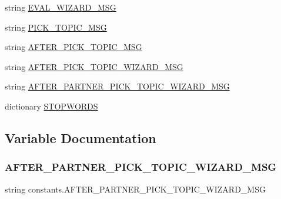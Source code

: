 \begin{DoxyCompactItemize}
\item 
string \hyperlink{namespaceconstants_a4352b762075995e38d4c552cc55c0c1b}{E\+V\+A\+L\+\_\+\+W\+I\+Z\+A\+R\+D\+\_\+\+M\+SG}
\item 
string \hyperlink{namespaceconstants_acae330a714f2af2847a73260cf9432b5}{P\+I\+C\+K\+\_\+\+T\+O\+P\+I\+C\+\_\+\+M\+SG}
\item 
string \hyperlink{namespaceconstants_a03deb02bcbfce040cb3032693984d549}{A\+F\+T\+E\+R\+\_\+\+P\+I\+C\+K\+\_\+\+T\+O\+P\+I\+C\+\_\+\+M\+SG}
\item 
string \hyperlink{namespaceconstants_a9467c4e56b02e5074de9e47080de58d2}{A\+F\+T\+E\+R\+\_\+\+P\+I\+C\+K\+\_\+\+T\+O\+P\+I\+C\+\_\+\+W\+I\+Z\+A\+R\+D\+\_\+\+M\+SG}
\item 
string \hyperlink{namespaceconstants_ae875e4f1f451355191b81441a2962af6}{A\+F\+T\+E\+R\+\_\+\+P\+A\+R\+T\+N\+E\+R\+\_\+\+P\+I\+C\+K\+\_\+\+T\+O\+P\+I\+C\+\_\+\+W\+I\+Z\+A\+R\+D\+\_\+\+M\+SG}
\item 
dictionary \hyperlink{namespaceconstants_a152298a9d1d6403ab158220917245953}{S\+T\+O\+P\+W\+O\+R\+DS}
\end{DoxyCompactItemize}


\subsection{Variable Documentation}
\mbox{\label{namespaceconstants_ae875e4f1f451355191b81441a2962af6}} 
\subsubsection{\texorpdfstring{A\+F\+T\+E\+R\+\_\+\+P\+A\+R\+T\+N\+E\+R\+\_\+\+P\+I\+C\+K\+\_\+\+T\+O\+P\+I\+C\+\_\+\+W\+I\+Z\+A\+R\+D\+\_\+\+M\+SG}{AFTER\_PARTNER\_PICK\_TOPIC\_WIZARD\_MSG}}
{\footnotesize\ttfamily string constants.\+A\+F\+T\+E\+R\+\_\+\+P\+A\+R\+T\+N\+E\+R\+\_\+\+P\+I\+C\+K\+\_\+\+T\+O\+P\+I\+C\+\_\+\+W\+I\+Z\+A\+R\+D\+\_\+\+M\+SG}

